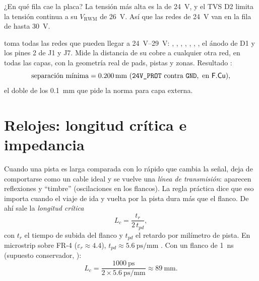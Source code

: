 ¿En qué fila cae la placa? La tensión más alta es la de \SI{24}{\volt}, y el TVS D2 limita la tensión continua a su
$V_\text{RWM}$ de \SI{26}{\volt}. Así que las redes de \SI{24}{\volt} van en la fila de hasta \SI{30}{\volt}.

\begin{calculo}
 toma todas las redes que pueden llegar a \SIrange{24}{29}{\volt}: ,
, , , , , , el ánodo de D1 y los pines 2 de
J1 y J7. Mide la distancia de su cobre a cualquier otra red, en todas las capas, con la geometría real de pads,
pistas y zonas. Resultado \medido:
\[
\text{separación mínima} = \SI{0.200}{\milli\meter}\ (\net{24V_PROT} \text{ contra } \net{GND}, \text{ en } \capa{F.Cu}),
\]
el doble de los \SI{0.1}{\milli\meter} que pide la norma para capa externa.
\end{calculo}

\section{Relojes: longitud crítica e impedancia}\label{sec:c10-relojes}

Cuando una pista es larga comparada con lo rápido que cambia la señal, deja de comportarse como un cable ideal y se
vuelve una \emph{línea de transmisión}: aparecen reflexiones y ``timbre'' (oscilaciones en los flancos). La regla
práctica dice que eso importa cuando el viaje de ida y vuelta por la pista dura más que el flanco. De ahí sale la
\emph{longitud crítica}
\begin{equation}\label{eq:c10-lc}
L_c = \frac{t_r}{2\,t_{pd}},
\end{equation}
con $t_r$ el tiempo de subida del flanco y $t_{pd}$ el retardo por milímetro de pista. En microstrip sobre FR-4
($\varepsilon_r \approx \num{4.4}$), $t_{pd} \approx \SI{5.6}{\pico\second\per\milli\meter}$ \copia. Con un flanco de
\SI{1}{\nano\second} (supuesto conservador, \estimado):
\[
L_c = \frac{\SI{1000}{\pico\second}}{2\times\SI{5.6}{\pico\second\per\milli\meter}} \approx \SI{89}{\milli\meter}.
\]

